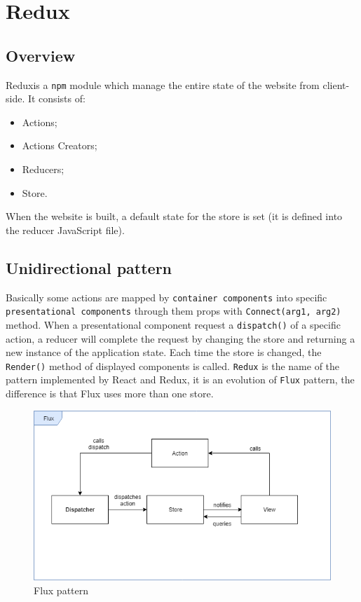 \section{Redux} 
\subsection{Overview}
Redux\glosp is a \texttt{npm} module which manage the entire state of the website from client-side. It consists of:
\begin{itemize}
	\item Actions;
	\item Actions Creators;
	\item Reducers;
	\item Store.
\end{itemize}
When the website is built, a default state for the store is set (it is defined into the reducer JavaScript file).
\subsection{Unidirectional pattern} 
Basically some actions are mapped by \texttt{container components} into specific \texttt{presentational components} through them props with \texttt{Connect(arg1, arg2)} method. When a presentational component request a \texttt{dispatch()} of a specific action, a reducer will complete the request by changing the store and returning a new instance of the application state. Each time the store is changed, the \texttt{Render()} method of displayed components is called.
\texttt{Redux} is the name of the pattern implemented by React and Redux, it is an evolution of \texttt{Flux} pattern, the difference is that Flux uses more than one store.\\
\begin{figure}[H]
	\centering\includegraphics[scale = 0.6]{res/images/Flux.png}
	\caption{Flux pattern}
\end{figure}

